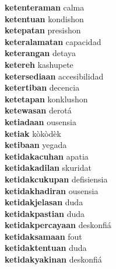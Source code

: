\textbf{ketenteraman } calma \\
\textbf{ketentuan } kondishon \\
\textbf{ketepatan } presishon \\
\textbf{keteralamatan } capacidad \\
\textbf{keterangan } detaya \\
\textbf{ketereh } kashupete \\
\textbf{ketersediaan } accesibilidad \\
\textbf{ketertiban } decencia \\
\textbf{ketetapan } konklushon \\
\textbf{ketewasan } derotá \\
\textbf{ketiadaan } ousensia \\
\textbf{ketiak } kòkòdèk \\
\textbf{ketibaan } yegada \\
\textbf{ketidakacuhan } apatia \\
\textbf{ketidakadilan } skuridat \\
\textbf{ketidakcukupan } defisiensia \\
\textbf{ketidakhadiran } ousensia \\
\textbf{ketidakjelasan } duda \\
\textbf{ketidakpastian } duda \\
\textbf{ketidakpercayaan } deskonfiá \\
\textbf{ketidaksamaan } fout \\
\textbf{ketidaktentuan } duda \\
\textbf{ketidakyakinan } deskonfiá \\

